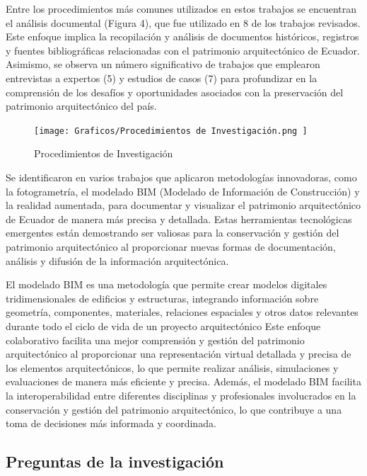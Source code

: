 \documentclass[journal,article,submit,pdftex,moreauthors]{Definitions/mdpi}
\begin{document}
Entre los procedimientos más comunes utilizados en estos trabajos se encuentran el análisis documental (Figura 4), que fue utilizado en 8 de los trabajos revisados. Este enfoque implica la recopilación y análisis de documentos históricos, registros y fuentes bibliográficas relacionadas con el patrimonio arquitectónico de Ecuador. Asimismo, se observa un número significativo de trabajos que emplearon entrevistas a expertos (5) y estudios de casos (7) para profundizar en la comprensión de los desafíos y oportunidades asociados con la preservación del patrimonio arquitectónico del país.
 
\par %
  \begin{figure} [h!]
    \centering
    \texttt{[image: Graficos/Procedimientos de Investigación.png ]}
    \caption{Procedimientos de Investigación}
    \label{fig:grafico}
\end{figure}
\par %
Se identificaron en varios trabajos que aplicaron metodologías innovadoras, como la fotogrametría, el modelado BIM (Modelado de Información de Construcción) y la realidad aumentada, para documentar y visualizar el patrimonio arquitectónico de Ecuador de manera más precisa y detallada. Estas herramientas tecnológicas emergentes están demostrando ser valiosas para la conservación y gestión del patrimonio arquitectónico al proporcionar nuevas formas de documentación, análisis y difusión de la información arquitectónica.

El modelado BIM es una metodología que permite crear modelos digitales tridimensionales de edificios y estructuras, integrando información sobre geometría, componentes, materiales, relaciones espaciales y otros datos relevantes durante todo el ciclo de vida de un proyecto arquitectónico\cite{art:articulo10} Este enfoque colaborativo facilita una mejor comprensión y gestión del patrimonio arquitectónico al proporcionar una representación virtual detallada y precisa de los elementos arquitectónicos, lo que permite realizar análisis, simulaciones y evaluaciones de manera más eficiente y precisa. Además, el modelado BIM facilita la interoperabilidad entre diferentes disciplinas y profesionales involucrados en la conservación y gestión del patrimonio arquitectónico, lo que contribuye a una toma de decisiones más informada y coordinada.
\par %
 \subsection{\textbf{Preguntas de la investigación}}  
\end{document}
